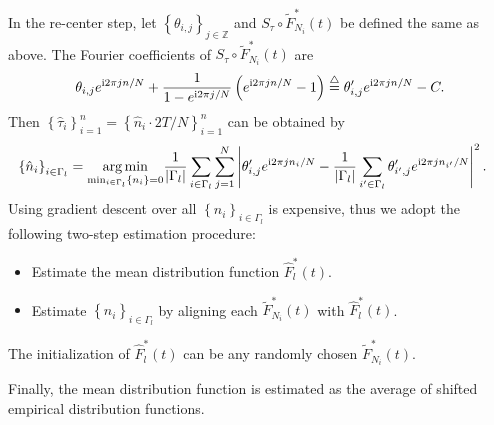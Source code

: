 		In the re-center step, let $\left\{ \theta_{i,j} \right\}_{j\in \mathbb{Z}}$ and $S_\tau\circ\tilde{F}^*_{N_i}(t)$ be defined the same as above.
		The Fourier coefficients of $S_\tau\circ\tilde{F}^*_{N_i}(t)$ are
		\begin{align*}
		\theta_{i,j}e^{\complexunit 2\pi j n/N}+
		\frac{1}{1-e^{\complexunit{}2\pi j /N}}
		\left( e^{\complexunit{}2\pi j n/N}-1 \right) 
		\overset{\triangle}{=}
		\theta_{i,j}' e^{\complexunit{}2\pi j n/N}-C. 
		\end{align*}
		Then
		$\left\{ \hat \tau_i \right\}_{i=1}^n = \left\{ \hat n_i\cdot 2T/N \right\}_{i=1}^n$ can be obtained by 
		\begin{align*}
		\left\{ \hat n_i \right\}_{i\in\Gamma_l} &= 
		\underset{\min_{i\in\Gamma_l} \left\{ n_i \right\}=0}{\arg\min}
		\frac{1}{|\Gamma_l|}
		\sum_{i\in\Gamma_l}
		\sum_{j=1}^N 
		\left| 
		\theta_{i,j}' e^{\complexunit{}2\pi j n_i/N} -
		\frac{1}{|\Gamma_l|}\sum_{i'\in\Gamma_l}\theta_{i',j}' e^{\complexunit{}2\pi j n_{i'}/N}  
		\right|^2 
		.
		\end{align*}
		Using gradient descent over all $\left\{ n_i \right\}_{i\in\Gamma_l}$ is expensive, thus we adopt the following two-step estimation procedure:
		\begin{itemize}
			\item Estimate the mean distribution function $\hat F^*_l(t)$.
			\item Estimate $\left\{ \hat n_i \right\}_{i\in\Gamma_l}$ by aligning each $\tilde F^*_{N_i}(t) $ with $\hat F^*_l(t)$.
		\end{itemize}
		The initialization of $\hat F^*_l(t)$ can be any randomly chosen $\tilde F^*_{N_i}(t) $.


		Finally, the mean distribution function is estimated as the average of shifted empirical distribution functions.		  



